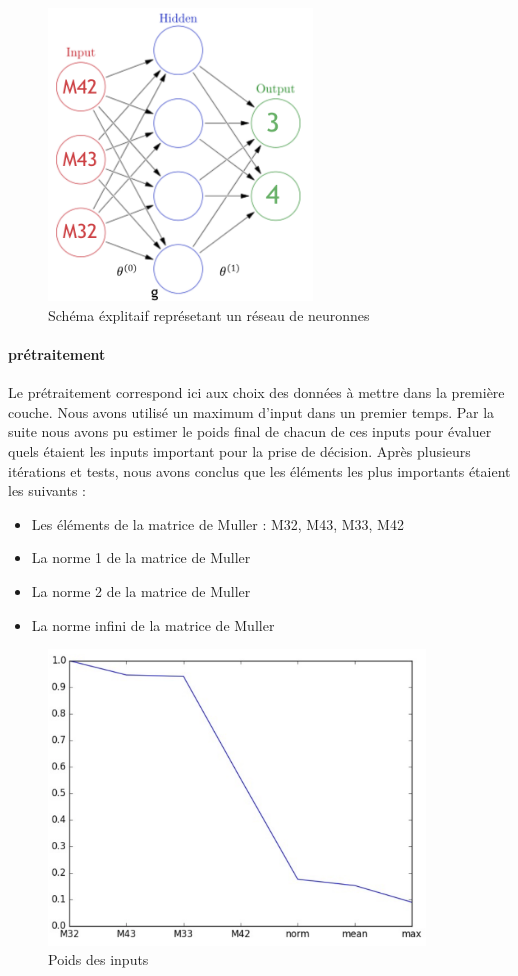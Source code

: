 \documentclass[a4paper,10pt]{report}
\begin{document}
\begin{figure}[H]
  \centering  
  \caption{Schéma éxplitaif représetant un réseau de neuronnes}
  \includegraphics[width=7cm]{nn_explanation.png}
\end{figure}

\paragraph{prétraitement}
Le prétraitement correspond ici aux choix des données à mettre dans la première couche. Nous avons utilisé un maximum d'input dans un premier temps. Par la suite nous avons pu estimer le poids final de chacun de  ces inputs pour évaluer quels étaient les inputs important pour la prise de décision. Après plusieurs itérations et tests, nous avons conclus que les éléments les plus importants étaient les suivants :

\begin{itemize}

    \item Les éléments de la matrice de Muller : M32, 	M43, M33, M42

    \item La norme 1 de la matrice de Muller 
    
    \item La norme 2 de la matrice de Muller 

    \item La norme infini de la matrice de Muller  

\end{itemize}

\begin{figure}[htbp]
  \caption{Poids des inputs}
  \centering
  \includegraphics[width=10cm]{input_weight_nn.png}
\end{figure}
\end{document}
